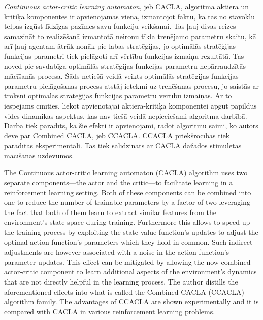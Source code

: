 \documentclass{ludis} %
\begin{document}
\maketitle

\begin{abstract-lv}
  \textit{Continuous actor-critic learning automaton}, jeb CACLA, algoritma
  aktiera un kritiķa komponentes ir apvienojamas vienā, izmantojot faktu, ka tās no
  stāvokļu telpas izgūst līdzīgas pazīmes savu funkciju veikšanai. Tas ļauj divas
  reizes samazināt to realizēšanā izmantotā neironu tīkla trenējamo parametru
  skaitu, kā arī ļauj aģentam ātrāk nonāk pie labas stratēģijas, jo
  optimālās stratēģijas funkcijas parametri tiek pielāgoti arī vērtību funkcijas
  izmaiņu rezultātā. Tas noved pie savdabīga optimālās stratēģijas funkcijas
  parametru nepārraudzītās mācīšanās procesa. Šāds netiešā veidā veikts optimālās
  stratēģijas funkcijas parametru pielāgošanas process atstāj ietekmi uz
  trenēšanas procesu, jo saistās ar troksni optimālās stratēģijas funkcijas
  parametru vērtību izmaiņās. Ar to iespējams cīnīties, liekot apvienotajai
  aktiera-kritiķa komponentei apgūt papildus vides dinamikas aspektus, kas nav
  tiešā veidā nepieciešami algoritma darbībā. Darbā tiek parādīts, kā šie efekti
  ir apvienojami, radot algoritmu saimi, ko autors dēvē par Combined CACLA, jeb
  CCACLA. CCACLA priekšrocības tiek parādītas eksperimentāli. Tas tiek salīdzināts
  ar CACLA dažādos stimulētās mācīšanās uzdevumos.

\end{abstract-lv}
\clearpage

\begin{abstract-en}
  The Continuous actor-critic learning automaton (CACLA) algorithm uses two
  separate components---the actor and the critic---to facilitate learning in a
  reinforcement learning setting. Both of these components can be combined into
  one to reduce the number of trainable parameters by a factor of two leveraging
  the fact that both of them learn to extract similar features from the
  environment's state space during training. Furthermore this allows to speed up
  the training process by exploiting the state-value function's updates to
  adjust the optimal action function's parameters which they hold in common.
  Such indirect adjustments are however associated with a noise in the action
  function's parameter updates. This effect can be mitigated by allowing the
  now-combined actor-critic component to learn additional aspects of the
  environment's dynamics that are not directly helpful in the learning process.
  The author distills the aforementioned effects into what is called the
  Combined CACLA (CCACLA) algorithm family. The advantages of CCACLA are shown
  experimentally and it is compared with CACLA in various reinforcement learning
  problems.

\end{abstract-en}
\end{document}
